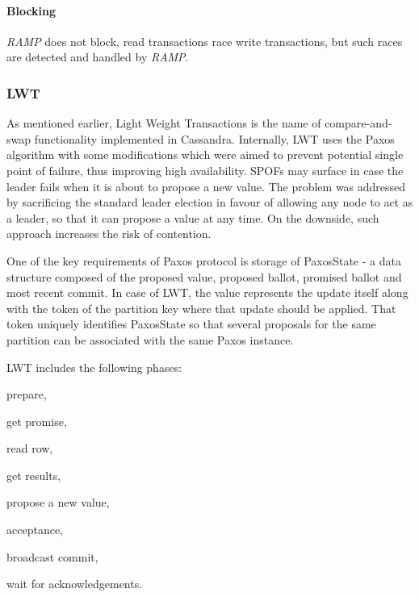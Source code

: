 \paragraph{Blocking} \emph{RAMP} does not block, read transactions race write transactions, but such races are detected and handled by \emph{RAMP}.




%

\subsubsection{LWT}\label{sec:theory:transactions:lwt}

As mentioned earlier, Light Weight Transactions is the name of compare-and-swap functionality implemented in Cassandra. Internally, LWT uses the Paxos algorithm with some modifications which were aimed to prevent potential single point of failure, thus improving high availability. SPOFs may surface in case the leader fails when it is about to propose a new value. The problem was addressed by sacrificing the standard leader election in favour of allowing any node to act as a leader, so that it can propose a value at any time. On the downside, such approach increases the risk of contention. 

One of the key requirements of Paxos protocol is storage of PaxosState - a data structure composed of the proposed value, proposed ballot, promised ballot and most recent commit. In case of LWT, the value represents the update itself along with the token of the partition key where that update should be applied. That token uniquely identifies PaxosState so that several proposals for the same partition can be associated with the same Paxos instance. 


LWT includes the following phases: \begin{enumerate*}[label=\alph*)]
\item prepare,
\item get promise,
\item read row,
\item get results,
\item propose a new value,
\item acceptance,
\item broadcast commit,
\item wait for acknowledgements.
\end{enumerate*} 

